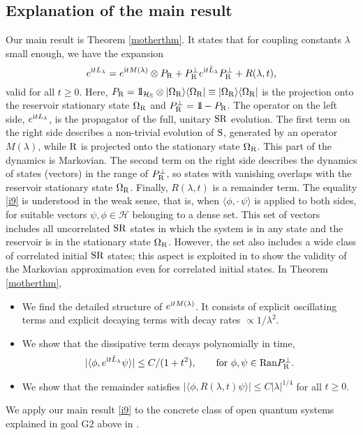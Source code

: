 \documentclass[letterpaper,onecolumn,11pt,accepted=2021-12-09]{quantumarticle}
\numberwithin{equation}{section}
\renewcommand{\r}{{\rm R}}
\newcommand{\s}{{\rm S}}
\renewcommand{\i}{{\rm i}}
\newcommand{\bbbone}{\mathchoice {\rm 1\mskip-4mu l} {\rm 1\mskip-4mu l}
	{\rm 1\mskip-4.5mu l} {\rm 1\mskip-5mu l}}
\begin{document}
\subsection{Explanation of the main result}

Our main result is Theorem \ref{motherthm}. It states that for coupling constants $\lambda$ small enough, we have the  expansion 
\begin{equation}
e^{\i tL_\lambda} = e^{\i t M(\lambda)}\otimes P_\r + P^\perp_\r e^{\i t \bar L_\lambda } P^\perp_\r +R(\lambda,t),
\label{i9}
\end{equation}
valid for all $t\ge 0$. Here, $P_\r =\bbbone_{{\mathcal H}_\s}\otimes|\Omega_\r\rangle\langle\Omega_\r|\equiv |\Omega_\r\rangle\langle\Omega_\r|$ is the projection onto the reservoir stationary state $\Omega_\r$ and $P_\r^\perp = \bbbone-P_\r$. The operator on the left side, $e^{\i t L_\lambda}$, is the propagator of the full, unitary $\s\r$ evolution. The first term on the right side describes a non-trivial evolution of $\s$, generated by an operator $M(\lambda)$, while $\r$ is projected onto the stationary state $\Omega_\r$. This part of the dynamics is Markovian. The second term on the right side describes the dynamics of states (vectors) in the range of $P^\perp_\r$, so states with vanishing overlaps with the reservoir stationary state $\Omega_\r$. Finally, $R(\lambda,t)$ is a remainder term. The equality \eqref{i9} is understood in the weak sense, that is, when $\langle\phi, \cdot\, \psi\rangle$ is applied to both sides, for suitable vectors $\psi,\phi\in\mathcal H$ belonging to a dense set. This set of vectors includes all uncorrelated $\s\r$ states in which the system is in any state and the reservoir is in the stationary state $\Omega_\r$. However, the set also includes a wide class of correlated initial $\s\r$ states; this aspect is exploited in \cite{Mcorr} to show the validity of the Markovian approximation even for correlated initial states.  In Theorem \ref{motherthm}, 
\begin{itemize}
	\item We find the detailed structure of $e^{\i t M(\lambda)}$. It consists of explicit oscillating terms and explicit decaying terms with decay rates $\propto 1/\lambda^2$.
	
	\item We show that the dissipative term decays polynomially in time, 
$$
|\langle\phi, e^{\i t \bar L_\lambda}\psi\rangle |\le C/(1+t^2),\qquad \mbox{for $\phi,\psi\in{\rm Ran} P^\perp_\r$.}
$$ 
	
	\item We show that the remainder satisfies $|\langle\phi, R(\lambda,t)\psi\rangle|\le C|\lambda|^{1/4}$ for all $t\ge 0$.  
\end{itemize}
We apply our main result \eqref{i9} to the concrete class of open quantum systems explained in goal G2 above in \cite{Markov2,Mcorr}.
\end{document}

